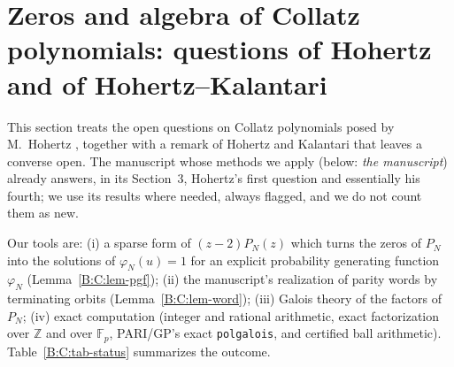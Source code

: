 \documentclass[11pt,a4paper]{article}
\theoremstyle{definition}
\theoremstyle{remark}
\numberwithin{equation}{section}
\begin{document}
\section{Zeros and algebra of Collatz polynomials: questions of Hohertz and of Hohertz--Kalantari}\label{B:C:sec}

This section treats the open questions on Collatz polynomials posed by
M.~Hohertz \cite[Section~5, ``Final remarks'']{R005}, together with a
remark of Hohertz and Kalantari \cite{R025} that leaves a converse open.  The manuscript
\cite{R021} whose methods we apply (below: \emph{the manuscript}) already
answers, in its Section~3, Hohertz's first question and essentially his fourth; we use its results where
needed, always flagged, and we do not count them as new.

Our tools are: (i) a sparse form of $(z-2)P_N(z)$ which turns the zeros of $P_N$
into the solutions of $\varphi_N(u)=1$ for an explicit probability generating
function $\varphi_N$ (Lemma~\ref{B:C:lem-pgf}); (ii) the manuscript's
realization of parity words by terminating orbits (Lemma~\ref{B:C:lem-word});
(iii) Galois theory of the factors of $P_N$; (iv) exact computation
(integer and rational arithmetic, exact factorization over $\mathbb Z$ and over
$\mathbb F_p$, PARI/GP's exact \texttt{polgalois}, and certified ball arithmetic).
Table~\ref{B:C:tab-status} summarizes the outcome.
\end{document}
